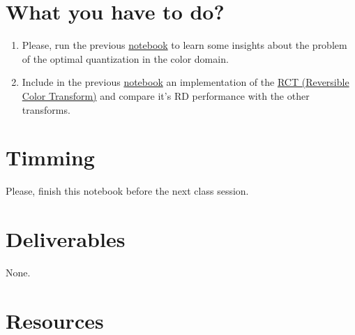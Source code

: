 \section{What you have to do?}

\begin{enumerate}
\item Please, run the previous
  \href{https://github.com/Sistemas-Multimedia/Sistemas-Multimedia.github.io/blob/master/study_guide/06-color_transform/performance.ipynb}{notebook}
  to learn some insights about the problem of the optimal
  quantization in the color domain.
\item Include in the previous
  \href{https://github.com/Sistemas-Multimedia/Sistemas-Multimedia.github.io/blob/master/study_guide/06-color_transform/performance.ipynb}{notebook}
  an implementation of the
  \href{https://en.wikipedia.org/wiki/JPEG_2000#Color_components_transformation}{RCT
    (Reversible Color Transform)} and compare it's RD performance with
  the other transforms.
\end{enumerate}

\section{Timming}

Please, finish this notebook before the next class session.

\section{Deliverables}

None.

\section{Resources}



